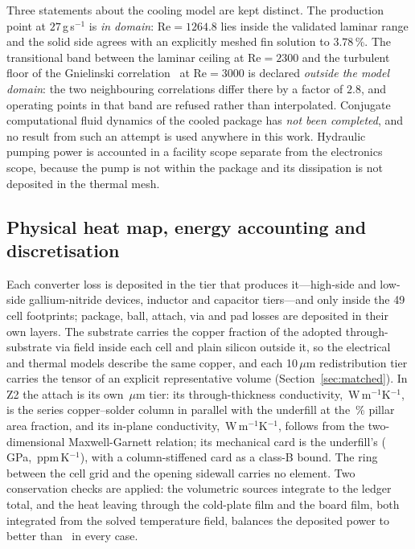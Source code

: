 \documentclass[journal]{IEEEtran}
\begin{document}
Three statements about the cooling model are kept distinct. The production point at
$27$\,g\,s$^{-1}$ is \emph{in domain}: $\mathrm{Re} = 1264.8$ lies inside the validated
laminar range and the solid side agrees with an explicitly meshed fin solution to
$3.78$\,\%. The transitional band between the laminar ceiling at $\mathrm{Re}=2300$ and the
turbulent floor of the Gnielinski correlation~\cite{Gnielinski1976} at $\mathrm{Re}=3000$ is
declared \emph{outside the model domain}: the two neighbouring correlations differ there by
a factor of $2.8$, and operating points in that band are refused rather than interpolated.
Conjugate computational fluid dynamics of the cooled package has \emph{not been completed},
and no result from such an attempt is used anywhere in this work. Hydraulic pumping power is
accounted in a facility scope separate from the electronics scope, because the pump is not
within the package and its dissipation is not deposited in the thermal mesh.

\subsection{Physical heat map, energy accounting and discretisation}\label{sec:heatmap}
Each converter loss is deposited in the tier that produces it---high-side and low-side
gallium-nitride devices, inductor and capacitor tiers---and only inside the 49 cell
footprints; package, ball, attach, via and pad losses are deposited in their own layers. The
substrate carries the copper fraction of the adopted through-substrate via field inside each
cell and plain silicon outside it, so the electrical and thermal models describe the same
copper, and each 10\,$\mu$m redistribution tier carries the tensor of an explicit
representative volume (Section~\ref{sec:matched}). In Z2 the attach is its own
\AttachH\,$\mu$m tier: its through-thickness conductivity, \AttachKz\,W\,m$^{-1}$K$^{-1}$, is the
series copper--solder column in parallel with the underfill at the \AttachAreaPct\,\% pillar area
fraction, and its in-plane conductivity, \AttachKxy\,W\,m$^{-1}$K$^{-1}$, follows from the
two-dimensional Maxwell-Garnett relation; its mechanical card is the underfill's
(\AttachEgpa\,GPa, \AttachCte\,ppm\,K$^{-1}$), with a column-stiffened card as a class-B bound.
The ring between the cell grid and the opening sidewall carries no element. Two conservation
checks are applied: the volumetric sources integrate to the ledger total, and the heat leaving
through the cold-plate film and the board film, both integrated from the solved temperature
field, balances the deposited power to better than \EnergyTol\ in every case.
\end{document}
